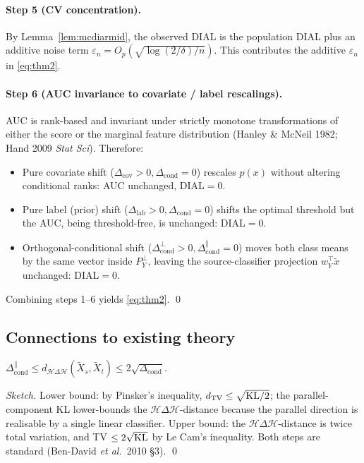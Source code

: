 \paragraph{Step 5 (CV concentration).}
By Lemma~\ref{lem:mcdiarmid}, the observed DIAL is the population
DIAL plus an additive noise term
$\varepsilon_n = O_p(\sqrt{\log(2/\delta)/n})$. This contributes
the additive $\varepsilon_n$ in \eqref{eq:thm2}.

\paragraph{Step 6 (AUC invariance to covariate / label rescalings).}
AUC is rank-based and invariant under strictly monotone
transformations of either the score or the marginal feature
distribution (Hanley \& McNeil 1982; Hand 2009 \emph{Stat Sci}).
Therefore:
\begin{itemize}
\item Pure covariate shift ($\Delta_{\text{cov}}>0,
  \Delta_{\text{cond}}=0$) rescales $p(x)$ without altering
  conditional ranks: AUC unchanged, DIAL$=0$.
\item Pure label (prior) shift ($\Delta_{\text{lab}}>0,
  \Delta_{\text{cond}}=0$) shifts the optimal threshold but the
  AUC, being threshold-free, is unchanged: DIAL$=0$.
\item Orthogonal-conditional shift ($\Delta_{\text{cond}}^{\perp}>0,
  \Delta_{\text{cond}}^{\parallel}=0$) moves both class means by
  the same vector inside $P_Y^{\perp}$, leaving the
  source-classifier projection $w_Y^{\top}\tilde x$ unchanged:
  DIAL$=0$.
\end{itemize}
Combining steps 1--6 yields \eqref{eq:thm2}. \qed

\subsection{Connections to existing theory}

\begin{proposition}
\label{prop:hdiv}
$\Delta_{\text{cond}}^{\parallel}\le d_{\mathcal{H}\Delta\mathcal{H}}
(\tilde X_s,\tilde X_t)\le 2\sqrt{\Delta_{\text{cond}}}$.
\end{proposition}

\begin{proof}[Sketch]
Lower bound: by Pinsker's inequality, $d_{\mathrm{TV}}\le
\sqrt{\mathrm{KL}/2}$; the parallel-component KL lower-bounds the
$\mathcal{H}\Delta\mathcal{H}$-distance because the parallel
direction is realisable by a single linear classifier.
Upper bound: the $\mathcal{H}\Delta\mathcal{H}$-distance is twice
total variation, and TV $\le 2\sqrt{\mathrm{KL}}$ by Le Cam's inequality.
Both steps are standard (Ben-David \emph{et al.}\ 2010 §3). \qed
\end{proof}

